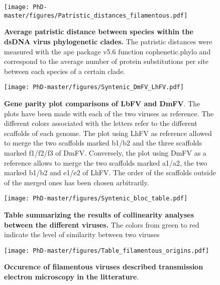 \begin{figure}[!htpbt]
\texttt{[image: PhD-master/figures/Patristic\_distances\_filamentous.pdf]}\centering
\caption[Paper2:Patristic distance distributions between \textit{Naldaviricetes} viruses]{\textbf{Average patristic distance between species within the dsDNA virus phylogenetic clades.} The patristic distances were measured with the ape package v5.6 function cophenetic.phylo and correspond to the average number of protein substitutions per site between each species of a certain clade.}
\label{figure:Patristic_distances_filamentous}
\end{figure}

\begin{figure}[!htpbt]
\texttt{[image: PhD-master/figures/Syntenic\_DmFV\_LhFV.pdf]}\centering
\caption[Paper2:Syntenic comparison between LhFV and DmFV]{\textbf{Gene parity plot comparisons of LbFV and DmFV}. The plots have been made with each of the two viruses as reference. The different colors associated with the letters refer to the different scaffolds of each genome. The plot using LhFV as reference allowed to merge the two scaffolds marked b1/b2 and the three scaffolds marked f1/f2/f3 of DmFV. Conversely, the plot using DmFV as a reference allows to merge the two scaffolds marked a1/a2, the two marked b1/b2 and e1/e2 of LhFV. The order of the scaffolds outside of the merged ones has been chosen arbitrarily.}
\label{figure:Syntenic_DmFV_LhFV}
\end{figure}

\begin{figure}[!htpbt]
\texttt{[image: PhD-master/figures/Syntenic\_bloc\_table.pdf]}\centering
\caption[Paper2:Syntenic filamentous blocs]{\textbf{Table summarizing the results of collinearity analyses between the different viruses.} The colors from green to red indicate the level of similarity between two viruses}
\label{figure:Syntenic_bloc_table}
\end{figure}



\begin{figure}[!htpbt]
\texttt{[image: PhD-master/figures/Table\_filamentous\_origins.pdf]}\centering
\caption[Paper2:Filamentous description in literature]{\textbf{Occurence of filamentous viruses described transmission electron microscopy in the litterature}.}
\label{figure:Table_filamentous_origins}
\end{figure}


